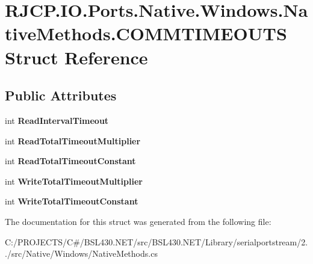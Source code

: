 \hypertarget{struct_r_j_c_p_1_1_i_o_1_1_ports_1_1_native_1_1_windows_1_1_native_methods_1_1_c_o_m_m_t_i_m_e_o_u_t_s}{}\section{R\+J\+C\+P.\+I\+O.\+Ports.\+Native.\+Windows.\+Native\+Methods.\+C\+O\+M\+M\+T\+I\+M\+E\+O\+U\+TS Struct Reference}
\label{struct_r_j_c_p_1_1_i_o_1_1_ports_1_1_native_1_1_windows_1_1_native_methods_1_1_c_o_m_m_t_i_m_e_o_u_t_s}
\subsection*{Public Attributes}
\begin{DoxyCompactItemize}
\item 
\mbox{\label{struct_r_j_c_p_1_1_i_o_1_1_ports_1_1_native_1_1_windows_1_1_native_methods_1_1_c_o_m_m_t_i_m_e_o_u_t_s_a55bc32ef546eda587d0847ef18a4d65d}} 
int {\bfseries Read\+Interval\+Timeout}
\item 
\mbox{\label{struct_r_j_c_p_1_1_i_o_1_1_ports_1_1_native_1_1_windows_1_1_native_methods_1_1_c_o_m_m_t_i_m_e_o_u_t_s_aa83602dd4f19d6860dc9f1a2e77a78de}} 
int {\bfseries Read\+Total\+Timeout\+Multiplier}
\item 
\mbox{\label{struct_r_j_c_p_1_1_i_o_1_1_ports_1_1_native_1_1_windows_1_1_native_methods_1_1_c_o_m_m_t_i_m_e_o_u_t_s_aeb128ab3f7b005bbc62a6df43ef210c7}} 
int {\bfseries Read\+Total\+Timeout\+Constant}
\item 
\mbox{\label{struct_r_j_c_p_1_1_i_o_1_1_ports_1_1_native_1_1_windows_1_1_native_methods_1_1_c_o_m_m_t_i_m_e_o_u_t_s_a5654c9c07fc8bdf4c4ffd35590594a62}} 
int {\bfseries Write\+Total\+Timeout\+Multiplier}
\item 
\mbox{\label{struct_r_j_c_p_1_1_i_o_1_1_ports_1_1_native_1_1_windows_1_1_native_methods_1_1_c_o_m_m_t_i_m_e_o_u_t_s_a010e5afd532c6487bc35972b06911770}} 
int {\bfseries Write\+Total\+Timeout\+Constant}
\end{DoxyCompactItemize}


The documentation for this struct was generated from the following file\+:\begin{DoxyCompactItemize}
\item 
C\+:/\+P\+R\+O\+J\+E\+C\+T\+S/\+C\#/\+B\+S\+L430.\+N\+E\+T/src/\+B\+S\+L430.\+N\+E\+T/\+Library/serialportstream/2../src/\+Native/\+Windows/Native\+Methods.\+cs\end{DoxyCompactItemize}
